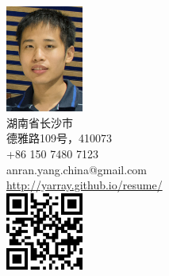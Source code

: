 \begin{nospace}\begin{flushright}
\vspace{-2.7em}
\includegraphics[width=1in]{photo.jpg}\\
湖南省长沙市
\\
德雅路109号，410073
\\
+86 150 7480 7123
\\
anran.yang.china@gmail.com
\\
\url{http://yarray.github.io/resume/}\\
\includegraphics[width=1in]{qr.eps}
\\
\end{flushright}\end{nospace}

